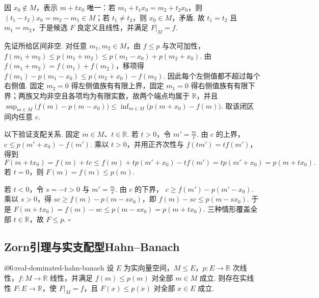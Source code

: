 \begin{FAProof}
因 \(\displaystyle x_0\notin M\)，表示 \(\displaystyle m+t x_0\) 唯一：若 \(\displaystyle m_1+t_1x_0=m_2+t_2x_0\)，则 \(\displaystyle (t_1-t_2)x_0=m_2-m_1\in M\)；若 \(\displaystyle t_1\neq t_2\)，则 \(\displaystyle x_0\in M\)，矛盾. 故 \(\displaystyle t_1=t_2\) 且 \(\displaystyle m_1=m_2\)，于是候选 \(\displaystyle F\) 良定义且线性，并满足 \(\displaystyle F|_M=f\).

先证所给区间非空. 对任意 \(\displaystyle m_1,m_2\in M\)，由 \(\displaystyle f\leqslant p\) 与次可加性， \(\displaystyle f(m_1+m_2) \leqslant p(m_1+m_2) \leqslant p(m_1-x_0)+p(m_2+x_0)\).
由 \(\displaystyle f(m_1+m_2)=f(m_1)+f(m_2)\)，移项得 \(\displaystyle f(m_1)-p(m_1-x_0) \leqslant p(m_2+x_0)-f(m_2)\).
因此每个左侧值都不超过每个右侧值. 固定 \(\displaystyle m_2=0\) 得左侧值族有有限上界，固定 \(\displaystyle m_1=0\) 得右侧值族有有限下界；两族又均非空且各项均为有限实数，故两个端点均属于 \(\displaystyle\mathbb R\)，并且 \(\displaystyle \sup_{m\in M}\bigl(f(m)-p(m-x_0)\bigr) \leqslant \inf_{m\in M}\bigl(p(m+x_0)-f(m)\bigr)\).
取该闭区间内任意 \(\displaystyle c\).

以下验证支配关系. 固定 \(\displaystyle m\in M\)、\(\displaystyle t\in\mathbb R\). 若 \(\displaystyle t>0\)，令 \(\displaystyle m'=\frac{m}{t}\). 由 \(\displaystyle c\) 的上界， \(\displaystyle c\leqslant p(m'+x_0)-f(m')\).
乘以 \(\displaystyle t>0\)，并用正齐次性与 \(\displaystyle f(tm')=tf(m')\)，得到
\[
F(m+t x_0)=f(m)+tc\leqslant f(m)+t p(m'+x_0)-t f(m')=t p(m'+x_0)=p(m+t x_0).
\]
若 \(\displaystyle t=0\)，则 \(\displaystyle F(m)=f(m)\leqslant p(m)\).

若 \(\displaystyle t<0\)，令 \(\displaystyle s=-t>0\) 与 \(\displaystyle m'=\frac{m}{s}\). 由 \(\displaystyle c\) 的下界， \(\displaystyle c\geqslant f(m')-p(m'-x_0)\).
乘以 \(\displaystyle s>0\)，得 \(\displaystyle sc\geqslant f(m)-p(m-sx_0)\)，即 \(\displaystyle f(m)-sc\leqslant p(m-sx_0)\).
于是 \(\displaystyle F(m+t x_0) =f(m)-sc \leqslant p(m-sx_0) =p(m+t x_0)\).
三种情形覆盖全部 \(\displaystyle t\in\mathbb R\)，故 \(\displaystyle F\leqslant p\).
\hfill\(\square\)
\end{FAProof}

\subsection{Zorn引理与实支配型Hahn--Banach}

\begin{FATheorem}{i06:real-dominated-hahn-banach}
设 \(\displaystyle E\) 为实向量空间，\(\displaystyle M\leqslant E\)，\(\displaystyle p:E\to\mathbb R\) 次线性，\(\displaystyle f:M\to\mathbb R\) 线性，并满足 \(\displaystyle f(m)\leqslant p(m)\) 对全部 \(\displaystyle m\in M\) 成立. 则存在实线性 \(\displaystyle F:E\to\mathbb R\)，使 \(\displaystyle F|_M=f\)，且 \(\displaystyle F(x)\leqslant p(x)\) 对全部 \(\displaystyle x\in E\) 成立.
\end{FATheorem}

